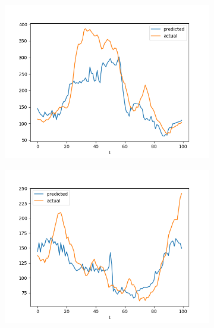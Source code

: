\documentclass[runningheads]{llncs}
\begin{document}
\begin{figure}
\begin{subfigure}{\figwidth}
            \includegraphics[width=\textwidth]{results/evaluation/c_model_graph_p70.png}
        \end{subfigure}
        \begin{subfigure}{\figwidth}
            \includegraphics[width=\textwidth]{results/evaluation/c_model_graph_p80.png}
        \end{subfigure}
        \begin{subfigure}{\figwidth}

\end{subfigure}
\end{figure}
\end{document}
